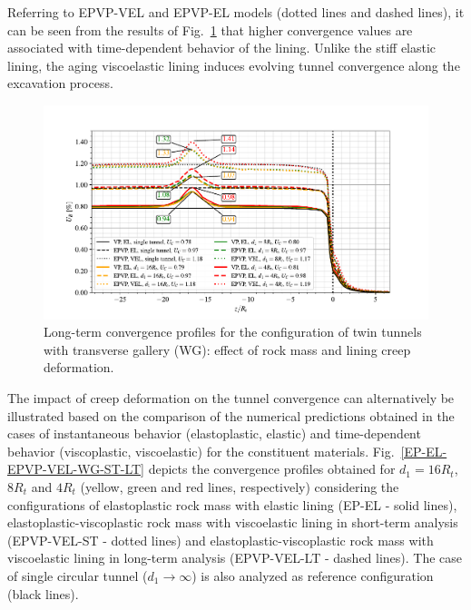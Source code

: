 \documentclass[Journal,letterpaper, NoLists,SectionNumbers]{ascelike-new}
\begin{document}
Referring to EPVP-VEL and EPVP-EL models (dotted lines and dashed lines), it can be seen from the results of Fig.~\ref{VP-EL-EPVP-VEL-WG-LT} that higher convergence values are associated with time-dependent behavior of the lining. Unlike the stiff elastic lining, the aging viscoelastic lining induces evolving tunnel convergence along the excavation process.

\begin{figure}[h!]
	\centering
	\includegraphics[scale=0.9]{Convergence Profiles - VP_EPVP_EL_VEL_WG_LT_anotate.pdf}
	\caption{Long-term convergence profiles for the configuration of twin tunnels with transverse gallery (WG): effect of rock mass and lining creep deformation.}
	\label{VP-EL-EPVP-VEL-WG-LT}
\end{figure}

The impact of creep deformation on the tunnel convergence can alternatively be illustrated based on the comparison of the numerical predictions obtained in the cases of instantaneous behavior (elastoplastic, elastic) and time-dependent behavior (viscoplastic, viscoelastic) for the constituent materials. Fig.~\ref{EP-EL-EPVP-VEL-WG-ST-LT} depicts the convergence profiles obtained for $d_1=16R_t$, $8R_t$ and $4R_t$ (yellow, green and red lines, respectively) considering the configurations of elastoplastic rock mass with elastic lining (EP-EL - solid lines), elastoplastic-viscoplastic rock mass with viscoelastic lining in short-term analysis (EPVP-VEL-ST - dotted lines) and elastoplastic-viscoplastic rock mass with viscoelastic lining in long-term analysis (EPVP-VEL-LT - dashed lines). The case of single circular tunnel ($d_1  \rightarrow \infty$) is also analyzed as reference configuration (black lines).
\end{document}
